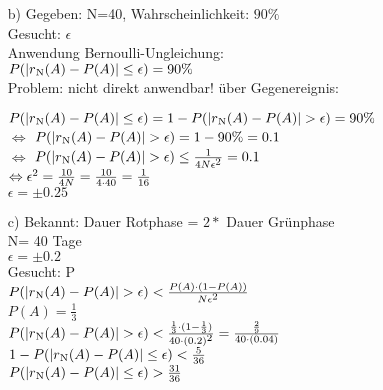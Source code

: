\documentclass[a4paper]{article}
\begin{document}
\begin{description}
\begin{itemize}
	\item[b)] Gegeben: N=40, Wahrscheinlichkeit: $90\%$ \\

		Gesucht: $\epsilon$\\
		
		Anwendung Bernoulli-Ungleichung:\\
		$P(\left|r\textsubscript{N}(A)-P(A)\right|\leq \epsilon)= 90\%$\\
		
		Problem: nicht direkt anwendbar!
		über Gegenereignis:
		
		$P(\left|r\textsubscript{N}(A)-P(A)\right|\leq \epsilon)=1-P(\left|r\textsubscript{N}(A)-P(A)\right|> \epsilon)=90\%$\\
		
		$\Leftrightarrow$ $P(\left|r\textsubscript{N}(A)-P(A)\right|> \epsilon)=1-90\% = 0.1$\\
		
		$\Leftrightarrow$ $P(\left|r\textsubscript{N}(A)-P(A)\right|> \epsilon) \leq \frac{1}{4N\epsilon\textsuperscript{2}} = 0.1$\\
		
		$\Leftrightarrow \epsilon\textsuperscript{2}= \frac{10}{4N}= \frac{10}{4\cdot40}=\frac{1}{16}$\\
		
		$\epsilon = \pm 0.25$\\
		
  \item[c)]	Bekannt: Dauer Rotphase = $2 *$ Dauer Grünphase\\
		N= 40 Tage\\
		$\epsilon= \pm 0.2$\\
		
		Gesucht: P\\
		
		$P(\left|r\textsubscript{N}(A)-P(A)\right|> \epsilon) < \frac{P(A)\cdot(1-P(A))}{N\epsilon\textsuperscript{2}}$\\
		$P(A)= \frac{1}{3}$\\
		
		$P(\left|r\textsubscript{N}(A)-P(A)\right|> \epsilon) < \frac{\frac{1}{3}\cdot(1-\frac{1}{3})}{40\cdot(0.2)\textsuperscript{2}}=\frac{\frac{2}{9}}{40\cdot(0.04)}$\\
		
		$1-P(\left|r\textsubscript{N}(A)-P(A)\right|\leq \epsilon) < \frac{5}{36}$\\
		
		$P(\left|r\textsubscript{N}(A)-P(A)\right|\leq \epsilon) > \frac{31}{36}$\\
		

\end{itemize}
\end{description}
\end{document}
